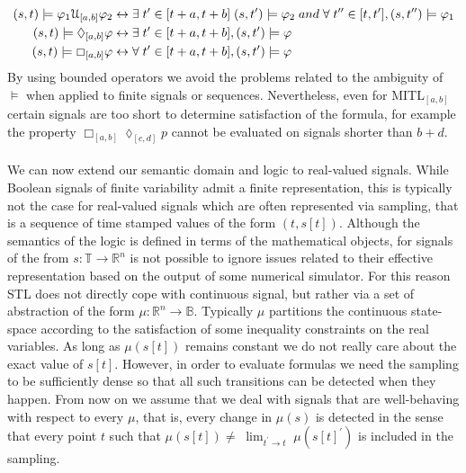 \begin{align*}
(s, t) \models \varphi_1 \EuScript{U}_{[a,b]} \varphi_2 &\leftrightarrow \exists \; t^\prime \in [t+a, t+b] \; (s, t^\prime) \models \varphi_2 \; and \; \forall \; t^{\prime \prime} \in [t, t^\prime], (s, t^{\prime \prime}) \models \varphi_1 \\
(s, t) \models \lozenge_{[a,b]} \varphi &\leftrightarrow \exists \; t^\prime \in [t+a, t+b], (s, t^\prime) \models \varphi \\
(s, t) \models \Box_{[a,b]} \varphi &\leftrightarrow \forall \; t^\prime \in [t+a, t+b], (s, t^\prime) \models \varphi
\end{align*}
By using bounded operators we avoid the problems related to the ambiguity
of $\models$ when applied to finite signals or sequences. Nevertheless, even for MITL$_{[a,b]}$ certain signals are too short to determine satisfaction of the formula, for example the property $\Box_{[a,b]}\lozenge_{[c,d]}p$ cannot be evaluated on signals shorter than $b + d$.

\paragraph{} We can now extend our semantic domain and logic to real-valued signals. While Boolean signals of finite variability admit a finite representation, this is typically not the case for real-valued signals which are often represented via sampling, that is a sequence
of time stamped values of the form $(t, s[t])$. Although the semantics of the logic is defined in terms of the mathematical objects, for signals of the from $s : \mathbb{T} \rightarrow \mathbb{R}^n$ is not possible to ignore issues related to their effective representation based on the output of some numerical simulator. For this reason STL does not directly cope with continuous signal, but rather via a set of abstraction of the form $\mu : \mathbb{R}^n \rightarrow \mathbb{B}$. Typically $\mu$ partitions the continuous state-space according to the satisfaction of some inequality constraints on the real variables. As long as $\mu(s[t])$ remains constant we do not really care about the exact value of $s[t]$. However, in order to evaluate formulas we need the sampling to be sufficiently dense so that all such transitions can be detected when they happen. From now on we assume that we deal with signals that are well-behaving with respect to every $\mu$, that is, every change in $\mu(s)$ is detected in the sense that every point $t$ such that $\displaystyle{\mu(s[t]) \neq \; \lim_{t^\prime\to t} \; \mu(s[t]^\prime)}$ is included in the sampling.

